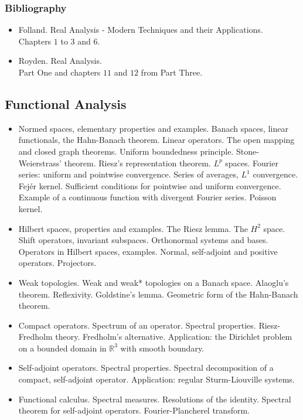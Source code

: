 \documentclass[spanish]{article}
\newcommand{\RR}{\mathbb{R}}
\begin{document}
\subsubsection{Bibliography}
\begin{itemize}
  \item Folland. Real Analysis - Modern Techniques and their Applications.\\
    Chapters $1$ to $3$ and $6$.

  \item Royden. Real Analysis.\\
    Part One and chapters $11$ and $12$ from Part Three.
\end{itemize}


\hrulefill%

\subsection{Functional Analysis}


\begin{itemize}
  \item
Normed spaces, elementary properties and examples. Banach spaces, linear functionals, the Hahn-Banach theorem. Linear operators. The open mapping and closed graph theorems. Uniform boundedness principle. Stone-Weierstrass' theorem. Riesz's representation theorem. $L^p$ spaces. Fourier series: uniform and pointwise convergence. Series of averages, $L^1$ convergence. Fej\'er kernel. Sufficient conditions for pointwise and uniform convergence. Example of a continuous function with divergent Fourier series. Poisson kernel.

  \item
Hilbert spaces, properties and examples. The Riesz lemma. The $H^2$ space. Shift operators, invariant subspaces. Orthonormal systems and bases. Operators in Hilbert spaces, examples. Normal, self-adjoint and positive operators. Projectors.

  \item
Weak topologies. Weak and weak* topologies on a Banach space. Alaoglu's theorem. Reflexivity. Goldstine's lemma. Geometric form of the Hahn-Banach theorem.

  \item
Compact operators. Spectrum of an operator. Spectral properties. Riesz-Fredholm theory. Fredholm's alternative. Application: the Dirichlet problem on a bounded domain in $\RR^3$ with smooth boundary.

  \item
Self-adjoint operators. Spectral properties. Spectral decomposition of a compact, self-adjoint operator. Application: regular Sturm-Liouville systems.

  \item
Functional calculus. Spectral measures. Resolutions of the identity. Spectral theorem for self-adjoint operators. Fourier-Plancherel transform.

\end{itemize}
\end{document}
